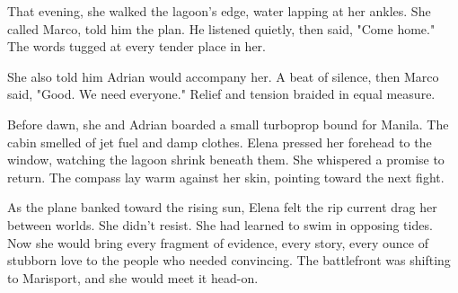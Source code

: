 That evening, she walked the lagoon's edge, water lapping at her ankles. She called Marco, told him the plan. He listened quietly, then said, "Come home." The words tugged at every tender place in her.

She also told him Adrian would accompany her. A beat of silence, then Marco said, "Good. We need everyone." Relief and tension braided in equal measure.

Before dawn, she and Adrian boarded a small turboprop bound for Manila. The cabin smelled of jet fuel and damp clothes. Elena pressed her forehead to the window, watching the lagoon shrink beneath them. She whispered a promise to return. The compass lay warm against her skin, pointing toward the next fight.

As the plane banked toward the rising sun, Elena felt the rip current drag her between worlds. She didn't resist. She had learned to swim in opposing tides. Now she would bring every fragment of evidence, every story, every ounce of stubborn love to the people who needed convincing. The battlefront was shifting to Marisport, and she would meet it head-on.

